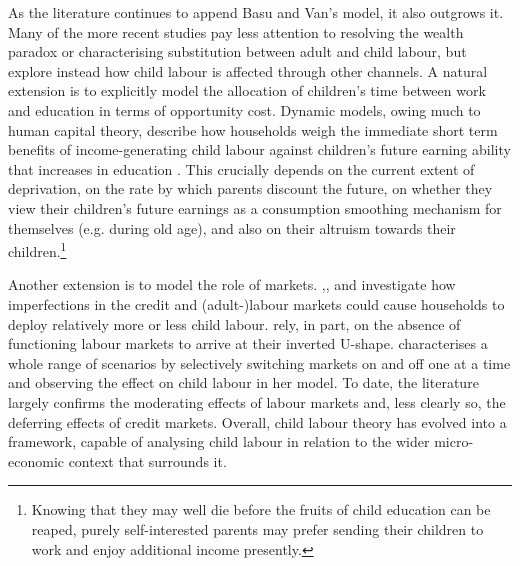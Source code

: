 \documentclass[a4paper,12pt]{article}
\theoremstyle{plain}
\theoremstyle{definition}
\theoremstyle{definition}
\theoremstyle{definition}
\theoremstyle{definition}
\begin{document}
As the literature continues to append Basu and Van's model, it also outgrows it. Many of the more recent studies pay less attention to resolving the wealth paradox or characterising substitution between adult and child labour, but explore instead how child labour is affected through other channels. A natural extension is to explicitly model the allocation of children's time between work and education in terms of opportunity cost. Dynamic models, owing much to human capital theory, describe how households weigh the immediate short term benefits of income-generating child labour against  children's future earning ability that increases in education \citep[see e.g.][]{Bar2009,Pal2012,Dendir2014, Edmonds2014,Chakraborty2018}. This crucially depends on the current extent of deprivation, on the rate by which parents discount the future, on whether they view their children's future earnings as a consumption smoothing mechanism for themselves (e.g. during old age), and also on their altruism towards their children.\footnote{Knowing that they may well die before the fruits of child education can be reaped, purely self-interested parents may prefer sending their children to work and enjoy additional income presently.}

Another extension is to model the role of markets. \citet{Baland2000},\citet{Bhalotra2003}, and \citet{Dumas2007}  investigate how imperfections in the credit and (adult-)labour markets could cause households to deploy relatively more or less child labour. \citet{Basu2010} rely, in part, on the absence of functioning labour markets to arrive at their inverted U-shape. \citet{Dumas2013,Dumas2015,Dumas2020} characterises a whole range of scenarios by selectively switching markets on and off one at a time and observing the effect on child labour in her model. To date, the literature largely confirms the moderating effects of labour markets and, less clearly so, the deferring effects of credit markets. Overall, child labour theory has evolved into a framework, capable of analysing child labour in relation to the wider micro-economic context that surrounds it.
\end{document}
